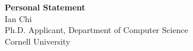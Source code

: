 \documentclass[11pt]{article}
\begin{document}
\begin{center}
    {\Large \textbf{Personal Statement}}\\[4pt]
    {\large Ian Chi}\\[2pt]
    Ph.D. Applicant, Department of Computer Science\\
    Cornell University
\end{center}

\vspace{1em}

\end{document}
